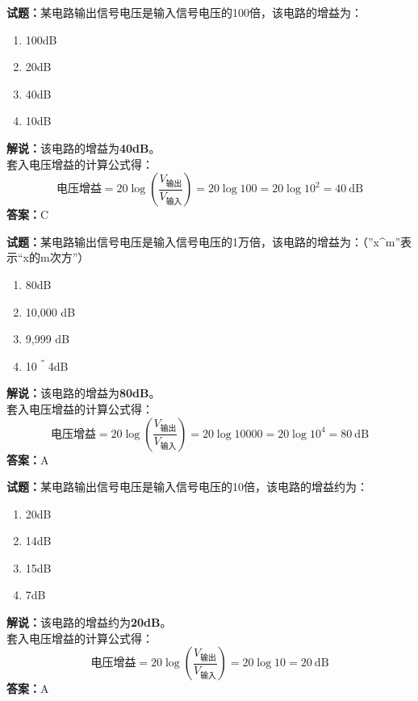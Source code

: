 \documentclass{ctexbook}
\begin{document}
\vspace{1em}

\textbf{试题：}某电路输出信号电压是输入信号电压的100倍，该电路的增益为：
\begin{enumerate}[leftmargin=3em]
  \item 100dB
  \item 20dB
  \item 40dB
  \item 10dB
\end{enumerate}
\noindent\textbf{解说：}该电路的增益为\textbf{40dB}。\\
套入电压增益的计算公式得：
$$\mbox{电压增益}=20 \log \left( {\frac{V_{ \mbox{输出} }}{V_{ \mbox{输入} }}} \right)=20 \log 100=20 \log 10^2= 40 \ \mathrm{dB}$$
\noindent\textbf{答案：}C

\vspace{1em}

\textbf{试题：}某电路输出信号电压是输入信号电压的1万倍，该电路的增益为：（”x\string^m”表示“x的m次方”）
\begin{enumerate}[leftmargin=3em]
  \item 80dB
  \item 10,000 dB
  \item 9,999 dB
  \item 10＾4dB
\end{enumerate}
\noindent\textbf{解说：}该电路的增益为\textbf{80dB}。\\
套入电压增益的计算公式得：
$$\mbox{电压增益}=20 \log \left( {\frac{V_{ \mbox{输出} }}{V_{ \mbox{输入} }}} \right)=20 \log 10000=20 \log 10^4= 80 \ \mathrm{dB}$$
\noindent\textbf{答案：}A

\vspace{1em}

\textbf{试题：}某电路输出信号电压是输入信号电压的10倍，该电路的增益约为：
\begin{enumerate}[leftmargin=3em]
  \item 20dB
  \item 14dB
  \item 15dB
  \item 7dB
\end{enumerate}
\noindent\textbf{解说：}该电路的增益约为\textbf{20dB}。\\
套入电压增益的计算公式得：
$$\mbox{电压增益}=20 \log \left( {\frac{V_{ \mbox{输出} }}{V_{ \mbox{输入} }}} \right)=20 \log 10=20 \ \mathrm{dB}$$
\noindent\textbf{答案：}A

\vspace{1em}
\end{document}
